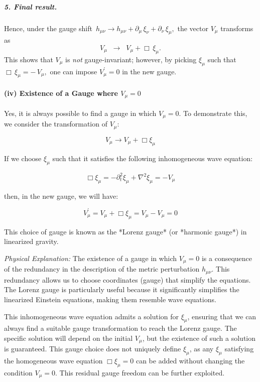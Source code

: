 \medskip

\noindent
\subparagraph{5. Final result.}
Hence, under the gauge shift 
\(\,h_{\mu\nu}\to h_{\mu\nu} + \partial_\mu\,\xi_\nu + \partial_\nu\,\xi_\mu,\)
the vector \(V_\mu\) transforms as
\[
\boxed{
  V_\mu
    \;\;\longrightarrow\;\;
  V_\mu + \Box\,\xi_\mu.
}
\]
This shows that \(V_\mu\) is \emph{not} gauge-invariant; however, by picking \(\xi_\mu\) such that
\(\Box\,\xi_\mu = -\,V_\mu,\) one can impose \(V_\mu^\prime=0\) in the new gauge.

\paragraph{(iv) Existence of a Gauge where $V_{\mu} = 0$}

Yes, it is always possible to find a gauge in which $V_{\mu} = 0$. To demonstrate this, we consider the transformation of $V_{\mu}$:

\begin{equation}
V_{\mu} \to V_{\mu} + \Box \xi_{\mu}
\end{equation}

If we choose $\xi_{\mu}$ such that it satisfies the following inhomogeneous wave equation:

\begin{equation}
\Box \xi_{\mu} = -\partial_t^2 \xi_\mu + \nabla^2 \xi_\mu = -V_{\mu}
\end{equation}

then, in the new gauge, we will have:

\begin{equation}
V_{\mu}^{\prime} = V_{\mu} + \Box \xi_{\mu} = V_{\mu} - V_{\mu} = 0
\end{equation}

This choice of gauge is known as the *Lorenz gauge* (or *harmonic gauge*) in linearized gravity.

\textit{Physical Explanation:} The existence of a gauge in which $V_{\mu} = 0$ is a consequence of the redundancy in the description of the metric perturbation $h_{\mu \nu}$. This redundancy allows us to choose coordinates (gauge) that simplify the equations. The Lorenz gauge is particularly useful because it significantly simplifies the linearized Einstein equations, making them resemble wave equations.

This inhomogeneous wave equation admits a solution for $\xi_\mu$, ensuring that we can always find a suitable gauge transformation to reach the Lorenz gauge. The specific solution will depend on the initial $V_\mu$, but the existence of such a solution is guaranteed. This gauge choice does not uniquely define $\xi_\mu$, as any $\xi_\mu$ satisfying the homogeneous wave equation $\Box \xi_\mu = 0$ can be added without changing the condition $V_\mu=0$. This residual gauge freedom can be further exploited.

